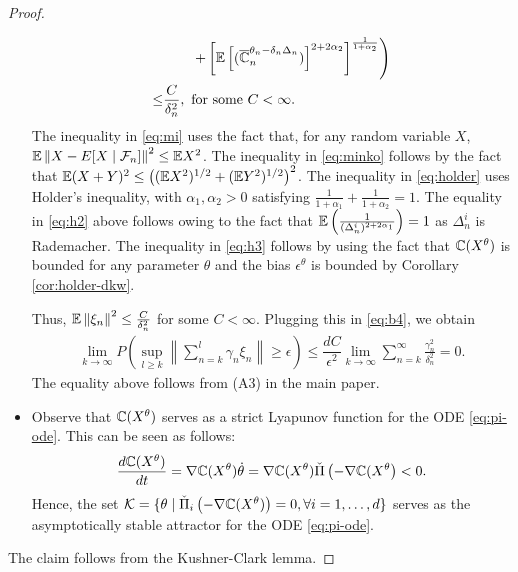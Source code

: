\begin{proof}
\begin{itemize}
\begin{align}
&\left.\qquad  +
\left[\mathbb{E}\left[ (\overline {\mathbb{C}}_n^{\theta_n - \delta_n \Delta_n})\right]^{2+2\alpha_2}\right]^{\frac{1}{1+\alpha_2}}\right) \label{eq:h2}\\
\le & \frac{C}{\delta_n^2}, \text{ for some } C< \infty. \label{eq:h3}
\end{align}
The inequality in \eqref{eq:mi} uses the fact that, for any random variable $X$, $\mathbb{E}\left\|X -  E[X\mid\mathcal{F}_n]\right\|^2 \le \mathbb{E} X^2$. The inequality in \eqref{eq:minko} follows by the fact that $\mathbb{E} (X+Y)^2 \le \left( (\mathbb{E} X^2)^{1/2} + (\mathbb{E} Y^2)^{1/2}\right)^2$.
The inequality in \eqref{eq:holder} uses Holder's inequality, with $\alpha_1, \alpha_2>0$ satisfying $\frac{1}{1+\alpha_1} + \frac{1}{1+\alpha_2}=1$. 
The equality in \eqref{eq:h2} above follows owing to the fact that $\mathbb{E}\left(\frac1{(\Delta_n^i)^{2+2\alpha_1}}\right)  = 1$ as $\Delta_n^i$ is Rademacher. 
The inequality in \eqref{eq:h3} follows by using the fact that
$\mathbb{C}(X^\theta)$ is bounded for any parameter $\theta$ and the bias $\epsilon^\theta$ is bounded by Corollary \ref{cor:holder-dkw}.

Thus, $\mathbb{E}\left\| \xi_n\right\|^2 \le \frac{C}{\delta_n^2}$ for some $C<\infty$. Plugging this in \eqref{eq:b4}, we obtain
\begin{align*}
 \lim_{k\rightarrow\infty} P\left( \sup_{l\geq k}   \left\|\sum_{n=k}^{l} \gamma_n \xi_n\right\|\geq \epsilon \right) \le \dfrac{d C}{\epsilon^2} \lim_{k\rightarrow\infty} \sum_{n=k}^{\infty}  \frac{\gamma_n^2}{\delta_n^2} =0.
\end{align*}
The equality above follows from (A3) in the main paper.
\item Observe that $\mathbb{C}(X^{\theta})$ serves as a strict Lyapunov function for the ODE \eqref{eq:pi-ode}. This can be seen as follows:
$$ \dfrac{d \mathbb{C}(X^{\theta})}{dt} = \nabla \mathbb{C}(X^{\theta}) \dot \theta = \nabla \mathbb{C}(X^{\theta}) \check\Pi \left(-\nabla \mathbb{C}(X^{\theta}\right) < 0.$$
Hence, the set $\mathcal{K} = \{\theta \mid \check\Pi_{i} \left(-\nabla \mathbb{C}(X^{\theta})\right)=0, \forall i=1,\ldots,d\}$ serves as the asymptotically stable attractor for the ODE \eqref{eq:pi-ode}.
\end{itemize} 
The claim follows from the Kushner-Clark lemma.
\end{proof}

